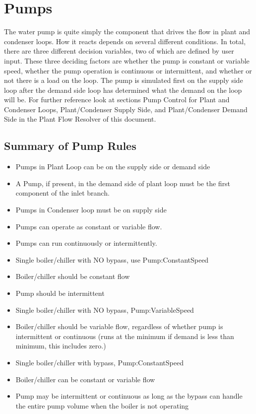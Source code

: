 \section{Pumps }\label{pumps}

The water pump is quite simply the component that drives the flow in plant and condenser loops. How it reacts depends on several different conditions. In total, there are three different decision variables, two of which are defined by user input. These three deciding factors are whether the pump is constant or variable speed, whether the pump operation is continuous or intermittent, and whether or not there is a load on the loop. The pump is simulated first on the supply side loop after the demand side loop has determined what the demand on the loop will be. For further reference look at sections Pump Control for Plant and Condenser Loops, Plant/Condenser Supply Side, and Plant/Condenser Demand Side in the Plant Flow Resolver of this document.

\subsection{Summary of Pump Rules}\label{summary-of-pump-rules}

\begin{itemize}
\item
  Pumps in Plant Loop can be on the supply side or demand side
\item
  A Pump, if present, in the demand side of plant loop must be the first component of the inlet branch.
\item
  Pumps in Condenser loop must be on supply side
\item
  Pumps can operate as constant or variable flow.
\item
  Pumps can run continuously or intermittently.
\item
  Single boiler/chiller with NO bypass, use Pump:ConstantSpeed
\item
  Boiler/chiller should be constant flow
\item
  Pump should be intermittent
\item
  Single boiler/chiller with NO bypass, Pump:VariableSpeed
\item
  Boiler/chiller should be variable flow, regardless of whether pump is intermittent or continuous (runs at the minimum if demand is less than minimum, this includes zero.)
\item
  Single boiler/chiller with bypass, Pump:ConstantSpeed
\item
  Boiler/chiller can be constant or variable flow
\item
  Pump may be intermittent or continuous as long as the bypass can handle the entire pump volume when the boiler is not operating
\end{itemize}

